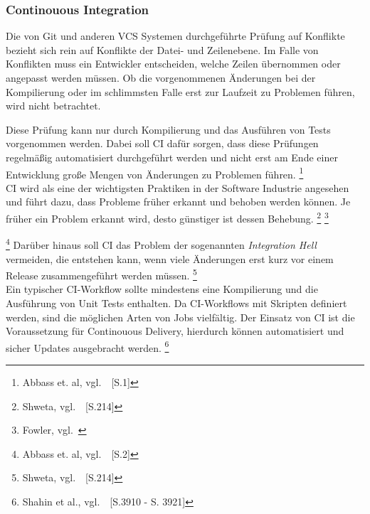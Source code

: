 \subsubsection{Continouous Integration}\label{ci}

Die von Git und anderen VCS Systemen durchgeführte Prüfung auf Konflikte bezieht sich rein auf Konflikte der Datei- und Zeilenebene.
Im Falle von Konflikten muss ein Entwickler entscheiden, welche Zeilen übernommen oder angepasst werden müssen.
Ob die vorgenommenen Änderungen bei der Kompilierung oder im schlimmsten Falle erst zur Laufzeit zu Problemen führen, wird nicht betrachtet.

Diese Prüfung kann nur durch Kompilierung und das Ausführen von Tests vorgenommen werden.
Dabei soll CI dafür sorgen, dass diese Prüfungen regelmäßig automatisiert durchgeführt werden und nicht erst am Ende einer Entwicklung große Mengen von Änderungen zu Problemen führen.
\footnote{Abbass et. al, vgl.~\cite{Abbass2019}~[S.1]} \\

CI wird als eine der wichtigsten Praktiken in der Software Industrie angesehen und führt dazu, dass Probleme früher erkannt und behoben werden können.
Je früher ein Problem erkannt wird, desto günstiger ist dessen Behebung.
\footnote{Shweta, vgl.~\cite{Shweta2014}~[S.214]}
\footnote{Fowler, vgl.~\cite{FOWLER_CI}}


\footnote{Abbass et. al, vgl.~\cite{Abbass2019}~[S.2]}
Darüber hinaus soll CI das Problem der sogenannten \textsl{Integration Hell} vermeiden, die entstehen kann, wenn viele Änderungen erst kurz vor einem Release zusammengeführt werden müssen.
\footnote{Shweta, vgl.~\cite{Shweta2014}~[S.214]} \\

Ein typischer CI-Workflow sollte mindestens eine Kompilierung und die Ausführung von Unit Tests enthalten.
Da CI-Workflows mit Skripten definiert werden, sind die möglichen Arten von Jobs vielfältig.
Der Einsatz von CI ist die Voraussetzung für Continouous Delivery, hierdurch können automatisiert und sicher Updates ausgebracht werden.
\footnote{Shahin et al., vgl.~\cite{Shahin2017}~[S.3910 - S. 3921]}

